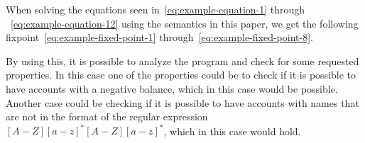 When solving the equations seen in~\autoref{eq:example-equation-1} through ~\autoref{eq:example-equation-12} using the semantics in this paper, we get the following fixpoint~\autoref{eq:example-fixed-point-1} through~\autoref{eq:example-fixed-point-8}.



By using this, it is possible to analyze the program and check for some requested properties.
In this case one of the properties could be to check if it is possible to have accounts with a negative balance, which in this case would be possible.
Another case could be checking if it is possible to have accounts with names that are not in the format of the regular expression $[A-Z][a-z]^* [A-Z][a-z]^*$, which in this case would hold.
